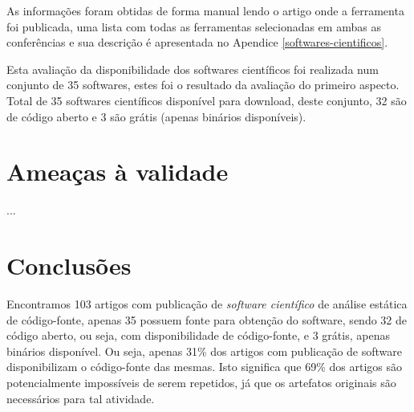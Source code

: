 As informações foram obtidas de forma manual lendo o artigo onde a ferramenta foi publicada,
uma lista com todas as ferramentas selecionadas em ambas as conferências e sua descrição
é apresentada no Apendice \ref{softwares-cientificos}.

Esta avaliação da disponibilidade dos softwares científicos foi realizada num
conjunto de 35 softwares, estes foi o resultado da avaliação do primeiro
aspecto.  Total de 35 softwares científicos disponível para download, deste
conjunto, 32 são de código aberto e 3 são grátis (apenas binários disponíveis).

\section{Ameaças à validade}

...

\section{Conclusões}

Encontramos 103 artigos com publicação de {\it software científico} de análise
estática de código-fonte, apenas 35 possuem fonte para obtenção do software,
sendo 32 de código aberto, ou seja, com disponibilidade de código-fonte, e 3
grátis, apenas binários disponível. Ou seja, apenas 31\% dos artigos com
publicação de software disponibilizam o código-fonte das mesmas. Isto significa
que 69\% dos artigos são potencialmente impossíveis de serem repetidos, já que
os artefatos originais são necessários para tal atividade.



%
%
%
